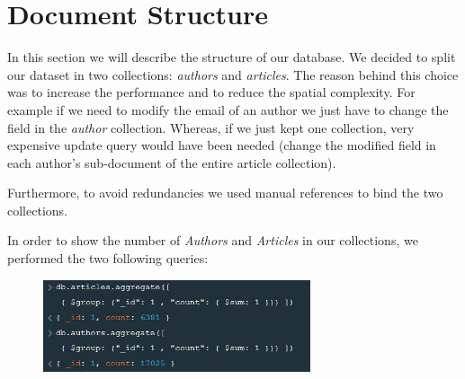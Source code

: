 \documentclass{Configuration_Files/PoliMi3i_thesis}
\begin{document}
\chapter{Document Structure}
\label{ch:document_structure}
In this section we will describe the structure of our database. We decided to split our dataset in two collections:
\emph{authors} and \emph{articles}. The reason behind this choice was to increase the performance and to reduce the
spatial complexity. For example if we need to modify the email of an author we just have to change the field in the
\emph{author} collection. Whereas, if we just kept one collection, very expensive update query would have been needed
(change the modified field in each author's sub-document of the entire article collection).\newline

Furthermore, to avoid redundancies we used manual references to bind the two collections.\newline

In order to show the number of \emph{Authors} and \emph{Articles} in our collections, we performed the two following queries:
\begin{figure}[H]
\centering
\includegraphics[width=0.7\textwidth]{instancenumber.jpg}
\label{fig:instances}
\end{figure}
\end{document}
